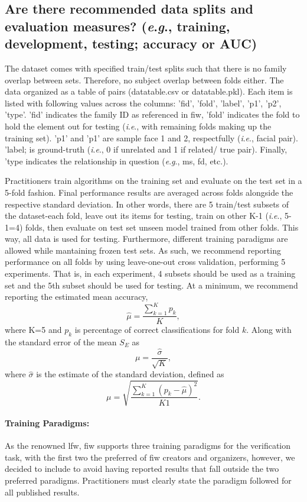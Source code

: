 \documentclass[a4paper,9pt]{extarticle}
\makeatletter
\newcommand{\ie}{\textit{i}.\textit{e}., }
\newcommand{\eg}{\textit{e}.\textit{g}., }
\newcommand*{\etc}{etc.\@\xspace}
\makeatother
\begin{document}
\begin{multicols}{2}
\subsection*{Are there recommended data splits and evaluation measures? (\eg training, development, testing; accuracy or AUC)}
\noindent The dataset comes with specified train/test splits such that there is no family overlap between sets. Therefore, no subject overlap between folds either. The data organized as a table of pairs (datatable.csv or datatable.pkl). Each item is listed with following values across the columns: 'fid', 'fold', 'label', 'p1', 'p2', 'type'. 'fid' indicates the family ID as referenced in \gls{fiw}, 'fold' indicates the fold to hold the element out for testing (\ie with remaining folds making up the training set). 'p1' and 'p1' are sample face 1 and 2, respectfully (\ie facial pair). 'label; is ground-truth (\ie 0 if unrelated and 1 if related/ true pair). Finally, 'type indicates the relationship in question (\eg \gls{ms}, \gls{fd}, \etc).

Practitioners train algorithms on the training set and evaluate on the test set in a 5-fold fashion. Final
performance results are averaged across folds alongside the respective standard deviation.
In other words, there are 5 train/test subsets of the dataset-each fold, leave out its items for testing, train on other K-1 (\ie 5-1=4) folds, then evaluate on test set unseen \wrt model trained from other folds. This way, all data is used for testing. Furthermore, different training paradigms are allowed while mantaining frozen test sets. As such, we recommend reporting performance on all folds by using leave-one-out cross validation, performing 5 experiments. That is, in each experiment, 4 subsets should be used as a training set and the 5th subset should be used for testing. At a minimum, we recommend reporting the estimated mean accuracy, $$\hat\mu=\frac{\sum^K_{k=1}p_k}{K},$$ where K=5 and $p_k$ is percentage of correct classifications for fold $k$. Along with the standard error of the mean $S_E$ as
$$
\mu=\frac{\hat\sigma}{\sqrt{K}},
$$
where $\hat\sigma$ is the estimate of the standard deviation, defined as
$$
\mu=\sqrt{\frac{\sum^K_{k=1}(p_k-\hat\mu)^2}{K 1}}.$$

\paragraph{Training Paradigms:} As the renowned \gls{lfw}, \gls{fiw} supports three training paradigms for the verification task, with the first two the preferred of \gls{fiw} creators and organizers, however, we decided to include to avoid having reported results that fall outside the two preferred paradigms. Practitioners must clearly state the paradigm followed for all published results.


\end{multicols}
\end{document}
